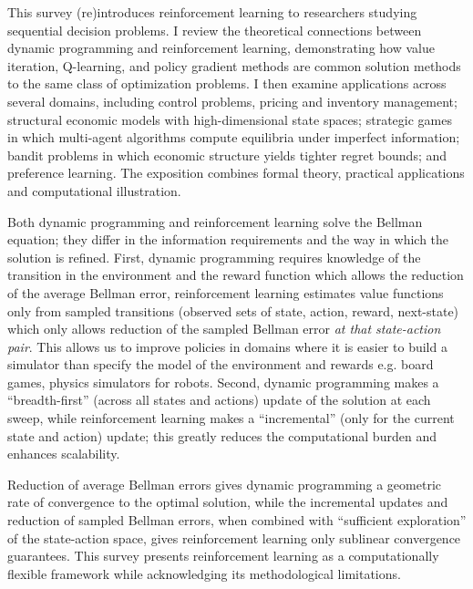 This survey (re)introduces reinforcement learning to researchers studying sequential decision problems. I review the theoretical connections between dynamic programming and reinforcement learning, demonstrating how value iteration, Q-learning, and policy gradient methods are common solution methods to the same class of optimization problems. I then examine applications across several domains, including control problems, pricing and inventory management; structural economic models with high-dimensional state spaces; strategic games in which multi-agent algorithms compute equilibria under imperfect information; bandit problems in which economic structure yields tighter regret bounds; and preference learning. The exposition combines formal theory, practical applications and computational illustration.

Both dynamic programming and reinforcement learning solve the Bellman equation; they differ in the information requirements and the way in which the solution is refined. First, dynamic programming requires knowledge of the transition in the environment and the reward function which allows the reduction of the average Bellman error, reinforcement learning estimates value functions only from sampled transitions (observed sets of state, action, reward, next-state) which only allows reduction of the sampled Bellman error \textit{at that state-action pair}. This allows us to improve policies in domains where it is easier to build a simulator than specify the model of the environment and rewards e.g. board games, physics simulators for robots. Second, dynamic programming makes a ``breadth-first'' (across all states and actions) update of the solution at each sweep, while reinforcement learning makes a ``incremental'' (only for the current state and action) update; this greatly reduces the computational burden and enhances scalability.

Reduction of average Bellman errors gives dynamic programming a geometric rate of convergence to the optimal solution, while the incremental updates and reduction of sampled Bellman errors, when combined with ``sufficient exploration'' of the state-action space, gives reinforcement learning only sublinear convergence guarantees. This survey presents reinforcement learning as a computationally flexible framework while acknowledging its methodological limitations.

